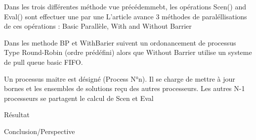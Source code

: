 \documentclass{beamer}
\begin{document}
        \begin{frame}
            Dans les trois différentes méthode vue précédemmebt, les opérations Scen() and Eval() sont effectuer une par une
            L'article avance 3 méthodes de paraléllisations de ces opérations : Basic Parallèle, With and Without Barrier            
            
            Dans les methode BP et WithBarier suivent un ordonancement de processus Type Round-Robin (ordre prédéfini) 
            alors que Without Barrier utilise un systeme de pull queue basic FIFO.
          
          
        \end{frame}
        
                \begin{frame}
            Un processus maitre est désigné (Process N°n). Il se charge de mettre à jour bornes et les ensembles de solutions reçu des autres processeurs. Les autres N-1 processeurs se partagent le calcul de Scen et Eval
            
          
          
        \end{frame}
        
        \begin{frame}

            Résultat

        \end{frame}
        
        \begin{frame}

	         Conclusion/Perspective

        \end{frame}

\end{document}
